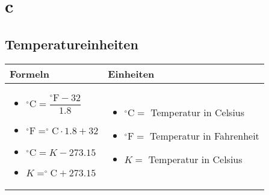 \newpage
\section{c}

\subsection{Temperatureinheiten}				%
	\begin{tabular}{ | m{9cm} | m{9cm}  | }
		\hline
		Formeln & Einheiten \\ \hline
		\hline
		\begin{itemize}
			\item $^\circ\text{C}=\dfrac{^\circ\text{F}-32}{1.8}$
			\item $^\circ\text{F}=^\circ\text{C}\cdot 1.8+32$
			\item $^\circ\text{C}=K-273.15$
			\item $K=^\circ\text{C}+273.15$
			
		\end{itemize}
		&
		\begin{itemize}
			\item $^\circ\text{C}=$ Temperatur in Celsius
			\item $^\circ\text{F}=$ Temperatur in Fahrenheit
			\item $K=$ Temperatur in Celsius
		\end{itemize}
		\\ \hline
	\end{tabular}

